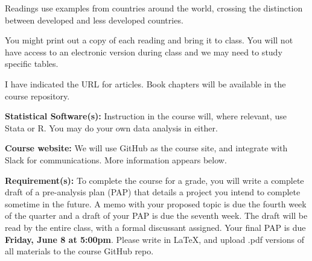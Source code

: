 \documentclass[11pt]{article}
\begin{document}
Readings use examples from countries around the world, crossing the 
distinction between developed
and less developed countries. 

You might print out a copy of each reading and bring it to class. You will not have access to an electronic version during
class and we may need to study specific tables. 

I have indicated the URL for articles. Book chapters
will be available in the course repository.

\textbf {\large Statistical Software(s):}  Instruction in the course will, where relevant, use Stata or R. You may do your own data analysis in either.  

\textbf{\large Course website:} We will use GitHub as the course site, and integrate with Slack for communications. More information appears below.

\textbf {\large Requirement(s):}  To complete the course for a grade, you will write a complete draft of a 
pre-analysis plan (PAP) that details a project you intend to complete sometime in the future. A memo with your proposed topic is due the fourth week of the quarter and a draft of your PAP is due the seventh week. The draft will be read by the entire class, with a formal discussant assigned. Your final PAP is due \textbf{Friday, June 8 at 5:00pm}.  Please write in LaTeX, and upload .pdf versions of all materials to the course GitHub repo.
\end{document}
